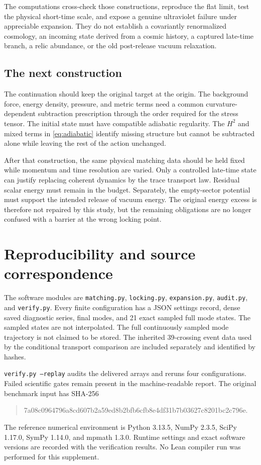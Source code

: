 \documentclass[11pt]{article}
\theoremstyle{definition}\newtheorem{definition}[theorem]{Definition}
\begin{document}
The computations cross-check those constructions, reproduce the flat limit, test the physical short-time scale, and expose a genuine ultraviolet failure under appreciable expansion. They do not establish a covariantly renormalized cosmology, an incoming state derived from a cosmic history, a captured late-time branch, a relic abundance, or the old post-release vacuum relaxation.

\subsection{The next construction}
The continuation should keep the original target at the origin. The background force, energy density, pressure, and metric terms need a common curvature-dependent subtraction prescription through the order required for the stress tensor. The initial state must have compatible adiabatic regularity. The $H^2$ and mixed terms in \eqref{eq:adiabatic} identify missing structure but cannot be subtracted alone while leaving the rest of the action unchanged.

After that construction, the same physical matching data should be held fixed while momentum and time resolution are varied. Only a controlled late-time state can justify replacing coherent dynamics by the trace transport law. Residual scalar energy must remain in the budget. Separately, the empty-sector potential must support the intended release of vacuum energy. The original energy excess is therefore not repaired by this study, but the remaining obligations are no longer confused with a barrier at the wrong locking point.

\appendix
\section{Reproducibility and source correspondence}
The software modules are \texttt{matching.py}, \texttt{locking.py}, \texttt{expansion.py}, \texttt{audit.py}, and \texttt{verify.py}. Every finite configuration has a JSON settings record, dense saved diagnostic series, final modes, and 21 exact sampled full mode states. The sampled states are not interpolated. The full continuously sampled mode trajectory is not claimed to be stored. The inherited 39-crossing event data used by the conditional transport comparison are included separately and identified by hashes.

\texttt{verify.py --replay} audits the delivered arrays and reruns four configurations. Failed scientific gates remain present in the machine-readable report. The original benchmark input has SHA-256
\begin{quote}\ttfamily\footnotesize
7a08c0964796a8cd607b2a59ed8b2bfb6cfb8e4df31b7b03627c8201bc2c796e.
\end{quote}
The reference numerical environment is Python 3.13.5, NumPy 2.3.5, SciPy 1.17.0, SymPy 1.14.0, and mpmath 1.3.0. Runtime settings and exact software versions are recorded with the verification results. No Lean compiler run was performed for this supplement.
\end{document}
